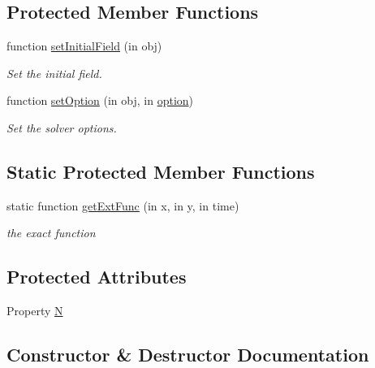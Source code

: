 \subsection*{Protected Member Functions}
\begin{DoxyCompactItemize}
\item 
function \hyperlink{class_adv_rotation_hybrid_mesh2d_ad05c3e38eb9cb202410b0c7dc17028d9}{set\+Initial\+Field} (in obj)
\begin{DoxyCompactList}\small\item\em Set the initial field. \end{DoxyCompactList}\item 
function \hyperlink{class_adv_rotation_hybrid_mesh2d_a97376942f0d95517151097844e849cd3}{set\+Option} (in obj, in \hyperlink{class_ndg_phys_af91f4c54b93504e76b38a5693774dff1}{option})
\begin{DoxyCompactList}\small\item\em Set the solver options. \end{DoxyCompactList}\end{DoxyCompactItemize}
\subsection*{Static Protected Member Functions}
\begin{DoxyCompactItemize}
\item 
static function \hyperlink{class_adv_rotation_hybrid_mesh2d_ad9c67aed0feed91c921bb5c36beb04c6}{get\+Ext\+Func} (in x, in y, in time)
\begin{DoxyCompactList}\small\item\em the exact function \end{DoxyCompactList}\end{DoxyCompactItemize}
\subsection*{Protected Attributes}
\begin{DoxyCompactItemize}
\item 
Property \hyperlink{class_adv_rotation_hybrid_mesh2d_ad3fd21bb05479b410845dd66ba0acee1}{N}
\end{DoxyCompactItemize}


\subsection{Constructor \& Destructor Documentation}
\mbox{\label{class_adv_rotation_hybrid_mesh2d_af996fb14cedc7119bf6ca6ba30b37335}} 
